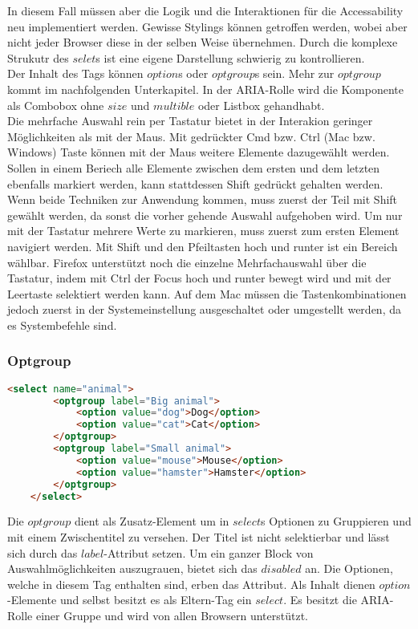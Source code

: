 In diesem Fall müssen aber die Logik und die Interaktionen für die Accessability neu implementiert werden.
Gewisse Stylings können getroffen werden, wobei aber nicht jeder Browser diese in der selben Weise übernehmen.
Durch die komplexe Strukutr des $selet$s ist eine eigene Darstellung schwierig zu kontrollieren.
\\
Der Inhalt des Tags können $option$s oder $optgroup$s sein.
Mehr zur $optgroup$ kommt im nachfolgenden Unterkapitel.
In der ARIA-Rolle wird die Komponente als Combobox ohne $size$ und $multible$ oder Listbox gehandhabt.
\\
Die mehrfache Auswahl rein per Tastatur bietet in der Interakion geringer Möglichkeiten als mit der Maus.
Mit gedrückter Cmd bzw. Ctrl (Mac bzw. Windows) Taste können mit der Maus weitere Elemente dazugewählt werden.
Sollen in einem Beriech alle Elemente zwischen dem ersten und dem letzten ebenfalls markiert werden, kann stattdessen Shift gedrückt gehalten werden.
Wenn beide Techniken zur Anwendung kommen, muss zuerst der Teil mit Shift gewählt werden, da sonst die vorher gehende Auswahl aufgehoben wird.
Um nur mit der Tastatur mehrere Werte zu markieren, muss zuerst zum ersten Element navigiert werden.
Mit Shift und den Pfeiltasten hoch und runter ist ein Bereich wählbar.
Firefox unterstützt noch die einzelne Mehrfachauswahl über die Tastatur, indem mit Ctrl der Focus hoch und runter bewegt wird und mit der Leertaste selektiert werden kann.
Auf dem Mac müssen die Tastenkombinationen jedoch zuerst in der Systemeinstellung ausgeschaltet oder umgestellt werden, da es Systembefehle sind.


\subsubsection{Optgroup}

\begin{lstlisting}[language = html, caption = Optgroup Example, label = code:OptgroupExample]
    <select name="animal">
        <optgroup label="Big animal">
            <option value="dog">Dog</option>
            <option value="cat">Cat</option>
        </optgroup>
        <optgroup label="Small animal">
            <option value="mouse">Mouse</option>
            <option value="hamster">Hamster</option>
        </optgroup>
    </select>
\end{lstlisting}

Die $optgroup$ dient als Zusatz-Element um in $select$s Optionen zu Gruppieren und mit einem Zwischentitel zu versehen.
Der Titel ist nicht selektierbar und lässt sich durch das $label$-Attribut setzen. 
Um ein ganzer Block von Auswahlmöglichkeiten auszugrauen, bietet sich das $disabled$ an.
Die Optionen, welche in diesem Tag enthalten sind, erben das Attribut.
Als Inhalt dienen $option$-Elemente und selbst besitzt es als Eltern-Tag ein $select$.
Es besitzt die ARIA-Rolle einer Gruppe und wird von allen Browsern unterstützt.


